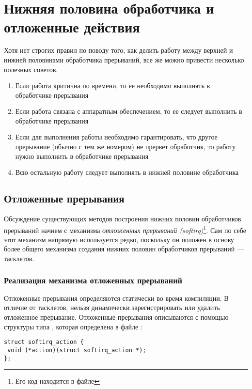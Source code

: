 \section{Нижняя половина обработчика и отложенные действия}

Хотя нет строгих правил по поводу того, как делить работу между верхней и нижней половинами обработчика прерываний, все же можно привести несколько полезных советов.

\begin{enumerate}
    \item Если работа критична по времени, то ее необходимо выполнять в обработчике прерывания
    \item Если работа связана с аппаратным обеспечением, то ее следует выполнить в обработчике прерывания
    \item Если для выполнения работы необходимо гарантировать, что другое прерывание (обычно с тем же номером) не прервет обработчик, то работу нужно выполнить в обработчике прерывания
    \item Всю остальную работу следует выполнять в нижней половине обработчика
\end{enumerate}

\subsection{Отложенные прерывания}

Обсуждение существующих методов построения нижних половин обработчиков прерываний начнем с механизма \textit{отложенных прерываний (softirq)}\footnote{Его код находится в файле }. Сам по себе этот механизм напрямую используется редко, поскольку он положен в основу более общего механизма создания нижних половин обработчиков прерываний — тасклетов.

\subsubsection{Реализация механизма отложенных прерываний}

Отложенные прерывания определяются статически во время компиляции. В отличие от тасклетов, нельзя динамически зарегистрировать или удалить отложенное прерывание. Отложенные прерывания описываются с помощью структуры типа , которая определена в файле :

\begin{lstlisting}
struct softirq_action {
 void (*action)(struct softirq_action *);
};
\end{lstlisting}

